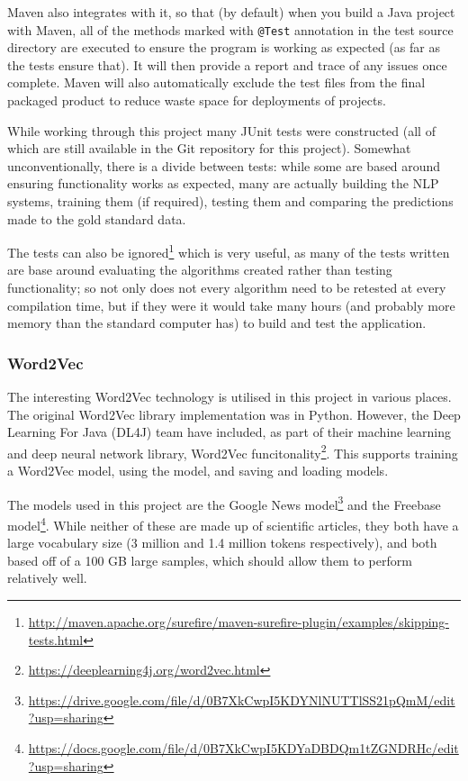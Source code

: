 Maven also integrates with it, so that (by default) when you build a Java project with Maven, all of the methods marked with \texttt{@Test} annotation in the test source directory are executed to ensure the program is working as expected (as far as the tests ensure that). It will then provide a report and trace of any issues once complete. Maven will also automatically exclude the test files from the final packaged product to reduce waste space for deployments of projects. 

While working through this project many JUnit tests were constructed (all of which are still available in the Git repository for this project). Somewhat unconventionally, there is a divide between tests: while some are based around ensuring functionality works as expected, many are actually building the NLP systems, training them (if required), testing them and comparing the predictions made to the gold standard data.

The tests can also be ignored\footnote{\href{http://maven.apache.org/surefire/maven-surefire-plugin/examples/skipping-tests.html}{http://maven.apache.org/surefire/maven-surefire-plugin/examples/skipping-tests.html}} which is very useful, as many of the tests written are base around evaluating the algorithms created rather than testing functionality; so not only does not every algorithm need to be retested at every compilation time, but if they were it would take many hours (and probably more memory than the standard computer has) to build and test the application. 

\subsubsection*{Word2Vec}
The interesting Word2Vec technology is utilised in this project in various places. The original Word2Vec library implementation was in Python. However, the Deep Learning For Java (DL4J) team have included, as part of their machine learning and deep neural network library, Word2Vec funcitonality\footnote{\href{https://deeplearning4j.org/word2vec.html}{https://deeplearning4j.org/word2vec.html}}. This supports training a Word2Vec model, using the model, and saving and loading models. 

The models used in this project are the Google News model\footnote{\href{https://drive.google.com/file/d/0B7XkCwpI5KDYNlNUTTlSS21pQmM/edit?usp=sharing}{https://drive.google.com/file/d/0B7XkCwpI5KDYNlNUTTlSS21pQmM/edit?usp=sharing}} and the Freebase model\footnote{\href{https://docs.google.com/file/d/0B7XkCwpI5KDYaDBDQm1tZGNDRHc/edit?usp=sharing}{https://docs.google.com/file/d/0B7XkCwpI5KDYaDBDQm1tZGNDRHc/edit?usp=sharing}}. While neither of these are made up of scientific articles, they both have a large vocabulary size (3 million and 1.4 million tokens respectively), and both based off of a 100 GB large samples, which should allow them to perform relatively well. 

